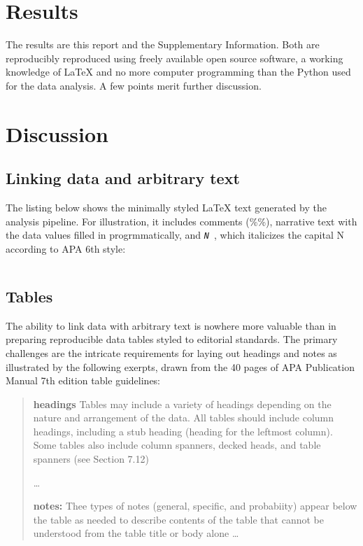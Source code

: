 \documentclass[helv,10pt,man,floatsintext]{apa6}  %
\begin{document}
\label{sec:results}

\section{Results}

The results are this report and the Supplementary Information. Both
are reproducibly reproduced using freely available open source
software, a working knowledge of \LaTeX{} and no more computer
programming than the Python used for the data analysis.  A few points
merit further discussion.

\section{Discussion}

\subsection{Linking data and arbitrary text}




The listing below shows the minimally styled \LaTeX{} text generated
by the analysis pipeline. For illustration, it includes comments
(\%\%), narrative text with the data values filled in progrmmatically,
and \texttt{{\it N }}, which italicizes the capital N
according to APA 6th style:

\inputminted{latex}{generated/arbitrary_text.tex}


\subsection{Tables}

The ability to link data with arbitrary text is nowhere more valuable
than in preparing reproducible data tables styled to editorial
standards.  The primary challenges are the intricate requirements for
laying out headings and notes as illustrated by the following exerpts,
drawn from the 40 pages of APA Publication Manual 7th edition table
guidelines:

\begin{quote}
{\bf headings} Tables may include a variety of headings depending on
the nature and arrangement of the data. All tables should include
column headings, including a stub heading (heading for the leftmost
column). Some tables also include column spanners, decked heads, and
table spanners (see Section 7.12) 

\ldots

{\bf notes:} Thee types of notes (general, specific, and probabiity)
appear below the table as needed to describe contents of the table
that cannot be understood from the table title or body alone \ldots
\end{quote}
\end{document}
